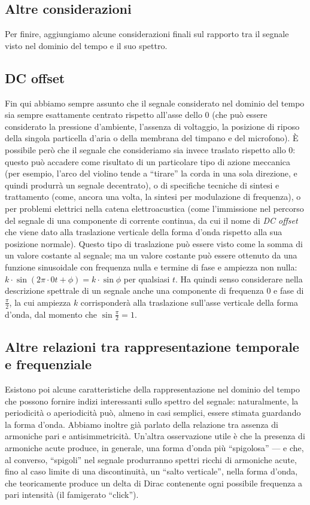 \subsection{Altre considerazioni}

Per finire, aggiungiamo alcune considerazioni finali sul rapporto tra il segnale visto nel dominio del tempo e il suo spettro.


\subsection{DC offset}

Fin qui abbiamo sempre assunto che il segnale considerato nel dominio del tempo sia sempre esattamente centrato rispetto all'asse dello 0 (che può essere considerato la pressione d'ambiente, l'assenza di voltaggio, la posizione di riposo della singola particella d'aria o della membrana del timpano e del microfono). È possibile però che il segnale che consideriamo sia invece traslato rispetto allo 0: questo può accadere come risultato di un particolare tipo di azione meccanica (per esempio, l'arco del violino tende a ``tirare'' la corda in una sola direzione, e quindi produrrà un segnale decentrato), o di specifiche tecniche di sintesi e trattamento (come, ancora una volta, la sintesi per modulazione di frequenza), o per problemi elettrici nella catena elettroacustica (come l'immissione nel percorso del segnale di una componente di corrente continua, da cui il nome di \emph{DC offset} che viene dato alla traslazione verticale della forma d'onda rispetto alla sua posizione normale). Questo tipo di traslazione può essere visto come la somma di un valore costante al segnale; ma un valore costante può essere ottenuto da una funzione sinusoidale con frequenza nulla e termine di fase e ampiezza non nulla: $k \cdot \sin(2\pi \cdot 0t + \phi ) = k \cdot \sin \phi $ per qualsiasi $t$. Ha quindi senso considerare nella descrizione spettrale di un segnale anche una componente di frequenza 0 e fase di $\frac{\pi}{2}$, la cui ampiezza $k$ corrisponderà alla traslazione sull'asse verticale della forma d'onda, dal momento che $\sin \frac{\pi}{2} = 1$.


\subsection{Altre relazioni tra rappresentazione temporale e frequenziale}

Esistono poi alcune caratteristiche della rappresentazione nel dominio del tempo che possono fornire indizi interessanti sullo spettro del segnale: naturalmente, la periodicità o aperiodicità può, almeno in casi semplici, essere stimata guardando la forma d'onda. Abbiamo inoltre già parlato della relazione tra assenza di armoniche pari e antisimmetricità. Un'altra osservazione utile è che la presenza di armoniche acute produce, in generale, una forma d'onda più ``spigolosa'' --- e che, al converso, ``spigoli'' nel segnale produrranno spettri ricchi di armoniche acute, fino al caso limite di una discontinuità, un  ``salto verticale'', nella forma d'onda, che teoricamente produce un delta di Dirac contenente ogni possibile frequenza a pari intensità (il famigerato ``click'').


